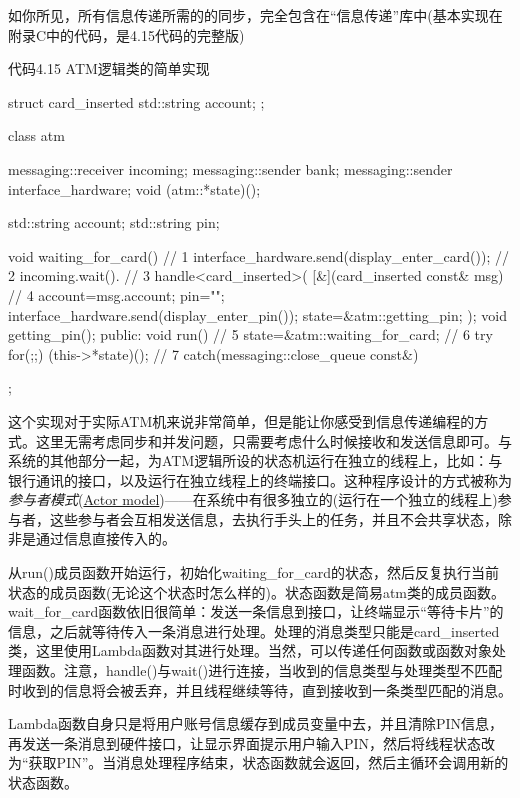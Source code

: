 如你所见，所有信息传递所需的的同步，完全包含在“信息传递”库中(基本实现在附录C中的代码，是4.15代码的完整版)

代码4.15 ATM逻辑类的简单实现

\begin{cpp}
struct card_inserted
{
  std::string account;
};

class atm
{
  messaging::receiver incoming;
  messaging::sender bank;
  messaging::sender interface_hardware;
  void (atm::*state)();

  std::string account;
  std::string pin;

  void waiting_for_card()  // 1
  {
    interface_hardware.send(display_enter_card());  // 2
    incoming.wait().  // 3
      handle<card_inserted>(
      [&](card_inserted const& msg)  // 4
      {
       account=msg.account;
       pin="";
       interface_hardware.send(display_enter_pin());
       state=&atm::getting_pin;
      }
    );
  }
  void getting_pin();
public:
  void run()  // 5
  {
    state=&atm::waiting_for_card;  // 6
    try
    {
      for(;;)
      {
        (this->*state)();  // 7
      }
    }
    catch(messaging::close_queue const&)
    {
    }
  }
};
\end{cpp}

这个实现对于实际ATM机来说非常简单，但是能让你感受到信息传递编程的方式。这里无需考虑同步和并发问题，只需要考虑什么时候接收和发送信息即可。与系统的其他部分一起，为ATM逻辑所设的状态机运行在独立的线程上，比如：与银行通讯的接口，以及运行在独立线程上的终端接口。这种程序设计的方式被称为\textit{参与者模式}(\href{http://zh.wikipedia.org/wiki/%E5%8F%83%E8%88%87%E8%80%85%E6%A8%A1%E5%BC%8F}{Actor model})——在系统中有很多独立的(运行在一个独立的线程上)参与者，这些参与者会互相发送信息，去执行手头上的任务，并且不会共享状态，除非是通过信息直接传入的。

从run()成员函数开始运行，初始化waiting\_for\_card的状态，然后反复执行当前状态的成员函数(无论这个状态时怎么样的)。状态函数是简易atm类的成员函数。wait\_for\_card函数依旧很简单：发送一条信息到接口，让终端显示“等待卡片”的信息，之后就等待传入一条消息进行处理。处理的消息类型只能是card\_inserted类，这里使用Lambda函数对其进行处理。当然，可以传递任何函数或函数对象处理函数。注意，handle()与wait()进行连接，当收到的信息类型与处理类型不匹配时收到的信息将会被丢弃，并且线程继续等待，直到接收到一条类型匹配的消息。

Lambda函数自身只是将用户账号信息缓存到成员变量中去，并且清除PIN信息，再发送一条消息到硬件接口，让显示界面提示用户输入PIN，然后将线程状态改为“获取PIN”。当消息处理程序结束，状态函数就会返回，然后主循环会调用新的状态函数。


